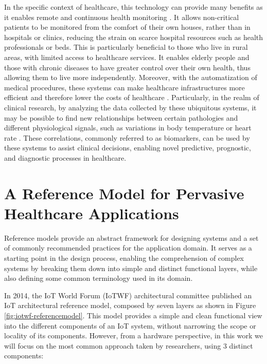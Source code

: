In the specific context of healthcare, this technology can provide many benefits as it enables remote and continuous health monitoring \cite{Doukas2012, Wu2020, Fan2014}. It allows non-critical patients to be monitored from the comfort of their own houses, rather than in hospitals or clinics, reducing the strain on scarce hospital resources such as health professionals or beds. This is particularly beneficial to those who live in rural areas, with limited access to healthcare services. It enables elderly people and those with chronic diseases to have greater control over their own health, thus allowing them to live more independently. Moreover, with the automatization of medical procedures, these systems can make healthcare infrastructures more efficient and therefore lower the costs of healthcare \cite{Catarinucci2015, Adame2018}. Particularly, in the realm of clinical research, by analyzing the data collected by these ubiquitous systems, it may be possible to find new relationships between certain pathologies and different physiological signals, such as variations in body temperature or heart rate \cite{Choi2016}. These correlations, commonly referred to as biomarkers, can be used by these systems to assist clinical decisions, enabling novel predictive, prognostic, and diagnostic processes in healthcare.

\section{A Reference Model for Pervasive Healthcare Applications}

Reference models provide an abstract framework for designing systems and a set of commonly recommended practices for the application domain. It serves as a starting point in the design process, enabling the comprehension of complex systems by breaking them down into simple and distinct functional layers, while also defining some common terminology used in its domain. \bigskip

In 2014, the \acs{IoT} World Forum (IoTWF) architectural committee published an \acs{IoT} architectural reference model, composed by seven layers as shown in Figure \ref{fig:iotwf-referencemodel}. This model \cite{Cisco2014} provides a simple and clean functional view into the different components of an \acs{IoT} system, without narrowing the scope or locality of its components. However, from a hardware perspective, in this work we will focus on the most common approach taken by researchers, using 3 distinct components: 

